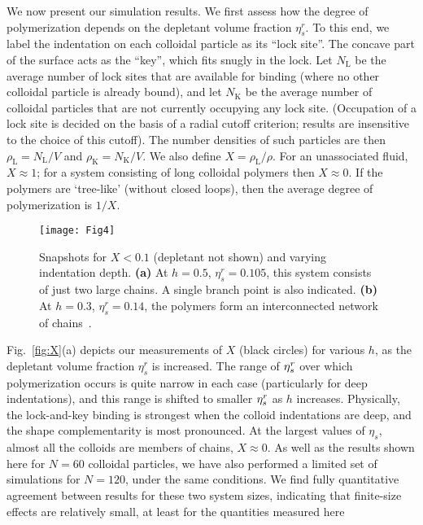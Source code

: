 \documentclass[10pt,onside,singlecolumn]{article}
\newcommand{\NL}{N_\mathrm{L}}
\newcommand{\NK}{N_\mathrm{K}}
\newcommand{\rhoL}{\rho_\mathrm{L}}
\newcommand{\rhoK}{\rho_\mathrm{K}}
\newcommand{\figurewidth}{0.95\textwidth}
\begin{document}
We now present our simulation results. We first assess how the degree of
polymerization depends on the depletant volume fraction $\eta_s^r$.
To this end, we label the indentation on each colloidal particle as
its ``lock site''. The concave part of the surface acts as the
``key'', which fits snugly in the lock.  Let $\NL$ be the average number of
lock sites that are available for binding (where no other colloidal
particle is already bound), and let $\NK$ be the average number of colloidal
particles that are not currently occupying any lock site.
(Occupation
of a lock site is decided on the basis of a radial cutoff criterion;
results are insensitive to the choice of this cutoff).
The 
number densities of such particles are then
$\rhoL=\NL/V$ and $\rhoK=\NK/V$.
We also define
$X=\rhoL/\rho$.  For an unassociated fluid, $X\approx 1$; for a system
consisting of long colloidal polymers then $X\approx 0$.  If the
polymers are `tree-like' (without closed loops), then the average
degree of polymerization is $1/X$.


\begin{figure} 
  \texttt{[image: Fig4]}

\caption{Snapshots for $X<0.1$ (depletant not shown) and varying
    indentation depth. {\bf (a)} At $h=0.5$, $\eta_s^r=0.105$, this
    system consists of just two large chains. A single branch point is
    also indicated. {\bf (b)} At
    $h=0.3$, $\eta_s^r=0.14$, the polymers form an
    interconnected network of chains~\cite{Bianchi06}.}
  \label{fig:other-snaps}

\end{figure}

Fig.~\ref{fig:X}(a) depicts our measurements of $X$ (black circles) for
various $h$, as the depletant volume fraction $\eta_s^r$ is
increased. The range of $\eta_s^r$ over which polymerization occurs is
quite narrow in each case (particularly for deep indentations), and
this range is shifted to smaller $\eta_s^r$ as $h$ increases.  Physically,
the lock-and-key binding is strongest when the colloid indentations
are deep, and the shape complementarity is most pronounced.  At the
largest values of $\eta_s$, almost all the colloids are members of
chains, $X\approx 0$.  As well as the results shown here for $N=60$ colloidal particles, we have also performed a limited set of simulations for $N=120$, under the same conditions. We find fully quantitative agreement between results for these two system sizes, indicating that finite-size effects are relatively small, at least for the quantities measured here
\end{document}
